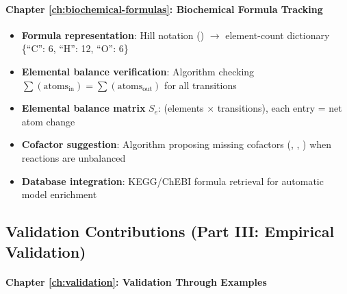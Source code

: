 \paragraph{Chapter \ref{ch:biochemical-formulas}: Biochemical Formula Tracking}

\begin{itemize}
    \item \textbf{Formula representation}: Hill notation () $\to$ element-count dictionary \{``C'': 6, ``H'': 12, ``O'': 6\}
    \item \textbf{Elemental balance verification}: Algorithm checking $\sum(\text{atoms}_{\text{in}}) = \sum(\text{atoms}_{\text{out}})$ for all transitions
    \item \textbf{Elemental balance matrix} $S_e$: (elements $\times$ transitions), each entry = net atom change
    \item \textbf{Cofactor suggestion}: Algorithm proposing missing cofactors (, , ) when reactions are unbalanced
    \item \textbf{Database integration}: KEGG/ChEBI formula retrieval for automatic model enrichment
\end{itemize}

\subsection{Validation Contributions (Part III: Empirical Validation)}
\label{subsec:validation-contributions}

\paragraph{Chapter \ref{ch:validation}: Validation Through Examples}

